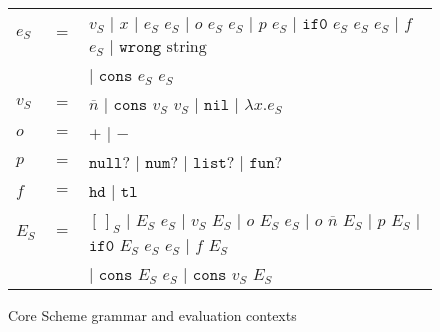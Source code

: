 \begin{figure}[p]
\centering
\begin{tabular}{lcl}
\vspace{5pt}

$e_{S}$ & $=$ & $v_{S}$ $\vert$ $x$ $\vert$ $e_{S}$ $e_{S}$ $\vert$ $o$ $e_{S}$ $e_{S}$ $\vert$ $p$ $e_{S}$ $\vert$ $\mathtt{if0}$ $e_{S}$ $e_{S}$ $e_{S}$ $\vert$ $f$ $e_{S}$ $\vert$ $\mathtt{wrong}$ $\mathrm{string}$ \\

\vspace{5pt}

&& $\vert$ $\mathtt{cons}$ $e_{S}$ $e_{S}$ \\

\vspace{5pt}

$v_{S}$ & $=$ & $\overline{n}$ $\vert$ $\mathtt{cons}$ $v_{S}$ $v_{S}$ $\vert$ $\mathtt{nil}$ $\vert$ $\lambda x.e_{S}$ \\

\vspace{5pt}

$o$ & $=$ & $+$ $\vert$ $-$ \\

\vspace{5pt}

$p$ & $=$ & $\mathtt{null?}$ $\vert$ $\mathtt{num?}$ $\vert$ $\mathtt{list?}$ $\vert$ $\mathtt{fun?}$ \\

\vspace{5pt}

$f$ & $=$ & $\mathtt{hd}$ $\vert$ $\mathtt{tl}$ \\

\vspace{5pt}

$E_{S}$ & $=$ & $[\,]_{S}$ $\vert$ $E_{S}$ $e_{S}$ $\vert$ $v_{S}$ $E_{S}$ $\vert$ $o$ $E_{S}$ $e_{S}$ $\vert$ $o$ $\overline{n}$ $E_{S}$ $\vert$ $p$ $E_{S}$ $\vert$ $\mathtt{if0}$ $E_{S}$ $e_{S}$ $e_{S}$ $\vert$ $f$ $E_{S}$ \\

\vspace{5pt}

&& $\vert$ $\mathtt{cons}$ $E_{S}$ $e_{S}$ $\vert$ $\mathtt{cons}$ $v_{S}$ $E_{S}$
\end{tabular}
\caption{Core Scheme grammar and evaluation contexts}
\label{csg}
\end{figure}